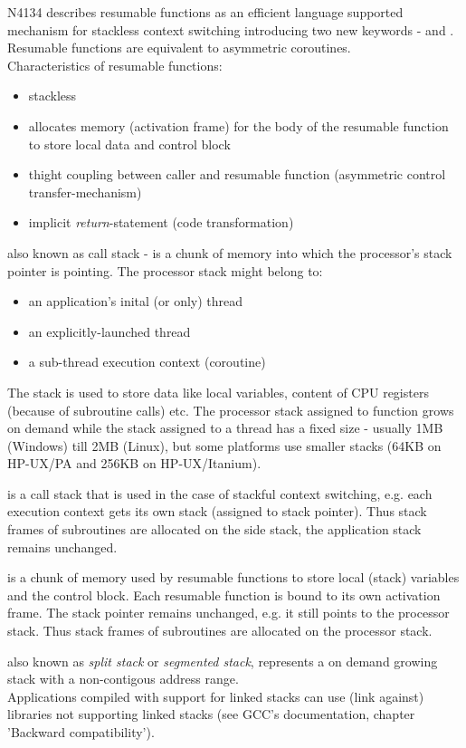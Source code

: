 N4134\cite{N4134} describes resumable functions as an efficient language
supported mechanism for stackless context switching introducing two new keywords
- \await and \yield. Resumable functions are equivalent to asymmetric
coroutines.\\
Characteristics of resumable functions:
\begin{itemize}
    \item stackless
    \item allocates memory (activation frame) for the body of the resumable
          function to store local data and control block
    \item thight coupling between caller and resumable function (asymmetric
          control transfer-mechanism)
    \item implicit \emph{return}-statement\cite{N4134} (code transformation)
\end{itemize}

also known as call stack - is a chunk of memory into which the processor's
stack pointer is pointing. The processor stack might belong to:
\begin{itemize}
    \item an application's inital (or only) thread
    \item an explicitly-launched thread
    \item a sub-thread execution context (coroutine)
\end{itemize}

The stack is used to store data like local variables, content of CPU registers
(because of subroutine calls) etc. The processor stack assigned to function
\main grows on demand while the stack assigned to a thread has a fixed size -
usually 1MB (Windows) till 2MB (Linux), but some platforms use smaller stacks
(64KB on HP-UX/PA and 256KB on HP-UX/Itanium).

is a call stack that is used in the case of stackful context switching, e.g.
each execution context gets its own stack (assigned to stack pointer). Thus
stack frames of subroutines are allocated on the side stack, the application
stack remains unchanged.

is a chunk of memory used by resumable functions to store local (stack)
variables and the control block. Each resumable function is bound to its own
activation frame. The stack pointer remains unchanged, e.g. it still points to
the processor stack. Thus stack frames of subroutines are allocated on the 
processor stack.

also known as \emph{split stack}\cite{gccsplit} or
\emph{segmented stack}\cite{llvmseg}, represents a on demand growing stack
with a non-contigous address range.\\
Applications compiled with support for linked stacks can use (link against)
libraries not supporting linked stacks (see GCC's documentation\cite{gccsplit},
chapter 'Backward compatibility').
